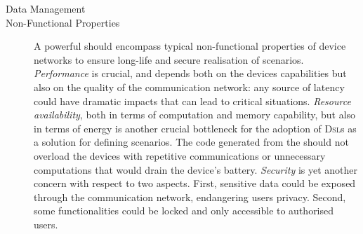 \begin{description}
	\item[Data Management]  
	
	\item[Non-Functional Properties] A powerful \DSL should encompass typical non-functional properties of device networks to ensure long-life and secure realisation of scenarios. \emph{Performance} is crucial, and depends both on the devices capabilities but also on the quality of the communication network: any source of latency could have dramatic impacts that can lead to critical situations. \emph{Resource availability}, both in terms of computation and memory capability, but also in terms of energy is another crucial bottleneck for the adoption of \textsc{Dsl}s as a solution for defining scenarios. The code generated from the \DSL should not overload the devices with repetitive communications or unnecessary computations that would drain the device's battery. \emph{Security} is yet another concern with respect to two aspects. First, sensitive data could be exposed through the communication network, endangering users privacy. Second, some functionalities could be locked and only accessible to authorised users.

\end{description}

